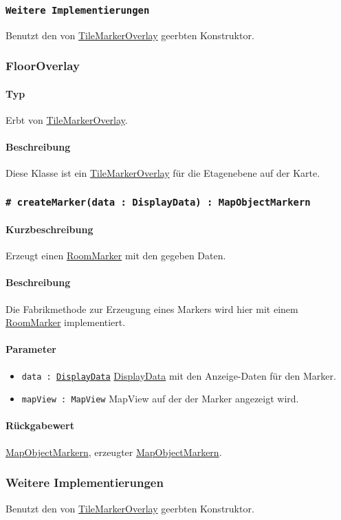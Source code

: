 \subsubsection*{\texttt{Weitere Implementierungen}}%
Benutzt den von \hyperref[App_Map_View_TileMarkerOverlay]{TileMarkerOverlay} geerbten Konstruktor.

\subsubsection{FloorOverlay}
\paragraph*{Typ}
Erbt von \hyperref[App_Map_View_TileMarkerOverlay]{TileMarkerOverlay}.
\paragraph*{Beschreibung}
Diese Klasse ist ein \hyperref[App_Map_View_TileMarkerOverlay]{TileMarkerOverlay} für die Etagenebene auf der Karte.

\subsubsection*{\texttt{\# createMarker(data : DisplayData) : MapObjectMarkern}}%
\paragraph*{Kurzbeschreibung}
Erzeugt einen \hyperref[App_Map_View_RoomMarker]{RoomMarker} mit den gegeben Daten.
\paragraph*{Beschreibung}
Die Fabrikmethode zur Erzeugung eines Markers wird hier mit einem \hyperref[App_Map_View_RoomMarker]{RoomMarker} implementiert.
\paragraph*{Parameter}
\begin{itemize}
    \item \texttt{data : \hyperref[App_Map_Util_DisplayData]{DisplayData}} \hyperref[App_Map_Util_DisplayData]{DisplayData} mit den Anzeige-Daten für den Marker.
    \item \texttt{mapView : MapView} MapView auf der der Marker angezeigt wird.
\end{itemize}
\paragraph*{Rückgabewert}
\hyperref[App_Map_View_MapObjectMarker]{MapObjectMarkern}, erzeugter \hyperref[App_Map_View_MapObjectMarker]{MapObjectMarkern}.

\subsubsection*{Weitere Implementierungen}%
Benutzt den von \hyperref[App_Map_View_TileMarkerOverlay]{TileMarkerOverlay} geerbten Konstruktor.
